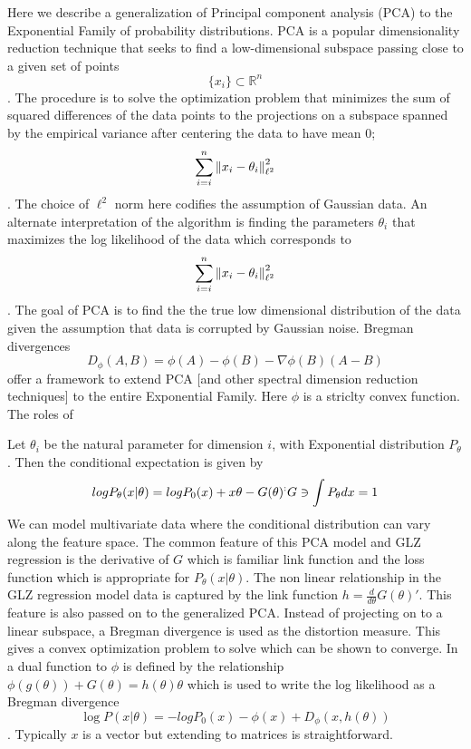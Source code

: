 Here we describe a generalization  of Principal component analysis (PCA) to the Exponential Family of probability distributions.  PCA is a popular dimensionality reduction technique that seeks to find a low-dimensional subspace passing close to a given set of points \begin{equation*}\{x_i\} \subset \mathbb{R}^n\end{equation*}.  The procedure is to solve the optimization problem that minimizes the sum of squared differences of the data points to the projections on a subspace spanned by the empirical variance after centering the data to have mean $0$;
\begin{equation*}
\sum\limits_{i=i}^{n} \left\Vert x_i - \theta_i\right\Vert^2_{\ell^2}
\end{equation*}.  The choice of $\ell^2$ norm here codifies the assumption of Gaussian data.  An alternate interpretation of the algorithm is finding the  parameters ${\theta_i}$ that maximizes the log likelihood of the data which corresponds to \begin{equation*}
\sum\limits_{i=i}^{n} \left\Vert x_i - \theta_i\right\Vert^2_{\ell^2}
\end{equation*}.  The goal of PCA is to find the the true low dimensional distribution   of the data given the assumption that data is corrupted by Gaussian noise.
Bregman divergences
  \begin{equation*}
  D_\phi(A,B)=\phi(A)-\phi(B) - \nabla \phi(B) (A-B)
\end{equation*}
offer a framework to extend PCA [and other spectral dimension reduction techniques] to the entire Exponential Family.  Here $\phi$ is a striclty convex function.  The roles of

Let  $\theta_i$ be the natural parameter for dimension $i$, with Exponential distribution $P_\theta$.  Then the conditional expectation is given by
\begin{equation*}
log P_\theta (x| \theta) = log P_0(x) + x \theta - G(\theta)  \sp : G \ni \int{ P_\theta dx} =1
\end{equation*}
We can model multivariate data where the conditional distribution can vary along the feature space.  The common feature of this PCA model and GLZ regression is the derivative of $G$ which is familiar link function and the loss function which is appropriate for $P_\theta (x | \theta)$.  The non linear relationship in the GLZ regression model data is captured by the link function $h = \frac{d}{d \theta}G(\theta)'$.  This feature is also passed on to the generalized PCA.  Instead of projecting on to a linear subspace, a Bregman divergence is used as the distortion measure.  This gives a convex optimization problem to solve which can be shown to converge.  In \cite{BDAzoury99relativeloss} a dual function  to  $\phi$ is defined by the relationship $\phi(g(\theta))+G(\theta)=h(\theta) \theta$ which is used to write the log likelihood as a Bregman divergence
\begin{equation*}
    \log P( x | \theta ) = -log P_0(x) - \phi(x) + D_\phi (x,h(\theta))
\end{equation*}.  Typically $x$ is a vector but extending to matrices is straightforward.


